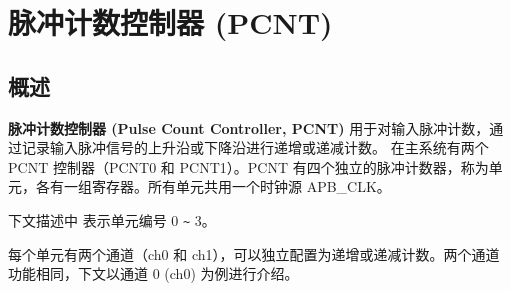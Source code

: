 \documentclass[main\_\_CN.tex]{subfiles}
\begin{document}

\ifglobal
\else
    \listoftodos
    {\let\clearpage\relax \listofdonetodos}
    \tableofcontents
\fi




\hypertarget{pcnt}{}
\chapter{脉冲计数控制器 (PCNT)}
\label{mod:pcnt}

\section{概述}
\label{sec:pcnt-overview}

\textbf{脉冲计数控制器 (Pulse Count Controller, PCNT)} 用于对输入脉冲计数，通过记录输入脉冲信号的上升沿或下降沿进行递增或递减计数。\chipname{} 在主系统有两个 PCNT 控制器（PCNT0 和 PCNT1）。PCNT 有四个独立的脉冲计数器，称为单元，各有一组寄存器。所有单元共用一个时钟源 APB\_CLK。

下文描述中  表示单元编号 0 \verb+~+ 3。

每个单元有两个通道（ch0 和 ch1），可以独立配置为递增或递减计数。两个通道功能相同，下文以通道 0 (ch0) 为例进行介绍。
\end{document}

